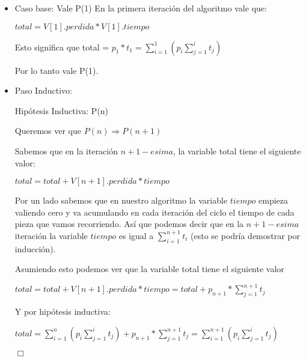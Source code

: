 \begin{itemize}
 \item Caso base: Vale P(1)
    En la primera iteración del algoritmo vale que:
    
      $total = V[1].perdida * V[1].tiempo$
      
    Esto significa que total = $p_1 * t_1 = \sum_{i=1}^{1}{(p_i \sum_{j=1}^{i}{t_j})}$
      
    Por lo tanto vale P(1).
    
  \item Paso Inductivo:
  
    Hipótesis Inductiva: P(n)
      
    Queremos ver que $P(n) \Rightarrow P(n+1)$
    
    Sabemos que en la iteración $n+1-esima$, la variable total tiene el siguiente valor:
    
      $total = total + V[n+1].perdida * tiempo$
      
    Por un lado sabemos que en nuestro algoritmo la variable $tiempo$ empieza valiendo cero y va acumulando en cada iteración del ciclo el tiempo de cada pieza que vamos recorriendo. Así que podemos decir que en la $n+1-esima$ iteración la variable $tiempo$ es igual a $\sum_{i=1}^{n+1}{t_i}$ (esto se podría demostrar por inducción).
    
    Asumiendo esto podemos ver que la variable total tiene el siguiente valor
    
      $total = total + V[n+1].perdida * tiempo = total + p_{n+1} * \sum_{j=1}^{n+1}{t_j}$
      
    Y por hipótesis inductiva:
    
      $total = \sum_{i=1}^{n}{(p_i \sum_{j=1}^{i}{t_j})} + p_{n+1} * \sum_{j=1}^{n+1}{t_j} = \sum_{i=1}^{n+1}{(p_i \sum_{j=1}^{i}{t_j})}$
      
    \begin{flushright}
    \hfill \ensuremath{\Box}
    \end{flushright}
\end{itemize}

